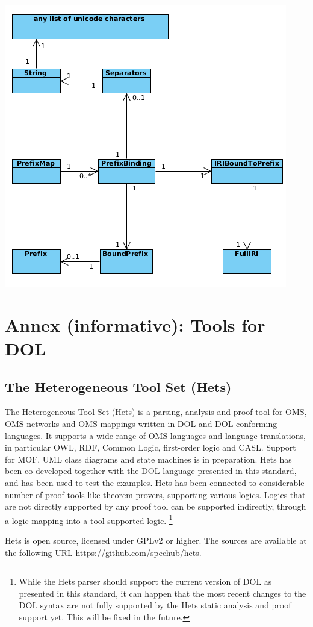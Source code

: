 \documentclass[10pt,fleqn,%
\ifpretendfinal
final%
\else
draft%
\fi,
]{scrreprt}
\newcommand{\sclause}[1]{\section{#1}}
\newcommand{\infannex}[1]{ \chapter{Annex (informative): #1} }
\begin{document}
\includegraphics[scale=0.6]{mof/dia/dia8.png}



\infannex{Tools for DOL}\label{a:tools}

\sclause{The Heterogeneous Tool Set (Hets)}\label{a:hets} The
Heterogeneous Tool Set (Hets) is a parsing, analysis and proof tool
for OMS, OMS networks and OMS mappings written in DOL and
DOL-conforming languages.  It supports a wide range of OMS languages
and language translations, in particular OWL, RDF, Common Logic,
first-order logic and CASL. Support for MOF, UML class diagrams and
state machines is in preparation.  Hets has been co-developed together
with the DOL language presented in this standard, and has been used to
test the examples. Hets has been connected to considerable number of
proof tools like theorem provers, supporting various logics. Logics
that are not directly supported by any proof tool can be supported
indirectly, through a logic mapping into a tool-supported logic.
\footnote {While the Hets parser should support the
  current version of DOL as presented in this standard, it can happen
  that the most recent changes to the DOL syntax are not fully
  supported by the Hets static analysis and proof support yet. This
  will be fixed in the future. }

Hets is open source, licensed under GPLv2 or higher. The sources are
available at the following URL \url{https://github.com/spechub/hets}.
\end{document}
